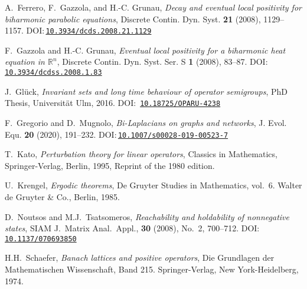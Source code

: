 \documentclass[a4paper, reqno]{amsart}
\numberwithin{equation}{section}
\theoremstyle{plain}
\theoremstyle{definition}
\theoremstyle{remark}
\begin{document}
\begin{thebibliography}{10}
	A.~Ferrero, F.~Gazzola, and H.-C. Grunau, \emph{Decay and eventual local
		positivity for biharmonic parabolic equations}, Discrete Contin. Dyn. Syst.
	\textbf{21} (2008), 1129--1157.
	DOI:\,\href{https://doi.org/10.3934/dcds.2008.21.1129}{\nolinkurl{10.3934/dcds.2008.21.1129}}
	
	F.~Gazzola and H.-C. Grunau, \emph{Eventual local positivity for a biharmonic
		heat equation in {$\mathbb{R}^n$}}, Discrete Contin. Dyn. Syst. Ser. S
	\textbf{1} (2008), 83--87.
	DOI:\,\href{https://doi.org/10.3934/dcdss.2008.1.83}{\nolinkurl{10.3934/dcdss.2008.1.83}}
	
	J.~Gl\"{u}ck, \emph{Invariant sets and long time behaviour of operator semigroups}, PhD Thesis, Universit\"{a}t Ulm, 2016.
	DOI:\, \href{http://dx.doi.org/10.18725/OPARU-4238}{\nolinkurl{10.18725/OPARU-4238}}
	
	F.~Gregorio and D.~Mugnolo, \emph{Bi-{L}aplacians on graphs and networks}, J.
	Evol. Equ. \textbf{20} (2020), 191--232.
	DOI:\,\href{https://doi.org/10.1007/s00028-019-00523-7}{\nolinkurl{10.1007/s00028-019-00523-7}}
	
	T.~Kato, \emph{Perturbation theory for linear operators}, Classics in Mathematics, Springer-Verlag, Berlin, 1995, Reprint of the 1980 edition.
	
	U.~Krengel, \emph{Ergodic theorems}, De Gruyter Studies in Mathematics, vol.~6. Walter de Gruyter \& Co., Berlin, 1985.
	
	D.~Noutsos and M.J.~Tsatsomeros, \emph{Reachability and holdability of nonnegative states}, SIAM J.~Matrix Anal.\ Appl., \textbf{30} (2008), No.~2, 700--712.
	DOI:\,\href{https://epubs.siam.org/doi/10.1137/070693850}{\nolinkurl{10.1137/070693850}}
	
	H.H.~Schaefer, \emph{Banach lattices and positive operators}, Die Grundlagen der Mathematischen Wissenschaft, Band 215. Springer-Verlag, New York-Heidelberg, 1974.
	
	
\end{thebibliography}
\end{document}
